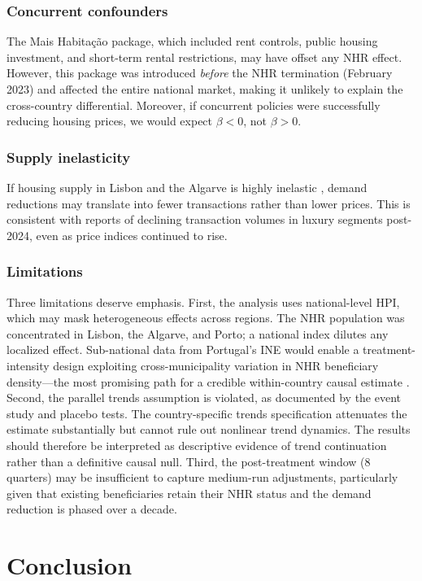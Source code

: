 \documentclass[12pt]{article}
\begin{document}
\subsubsection*{Concurrent confounders} The Mais Habita\c{c}\~{a}o package, which included rent controls, public housing investment, and short-term rental restrictions, may have offset any NHR effect. However, this package was introduced \emph{before} the NHR termination (February 2023) and affected the entire national market, making it unlikely to explain the cross-country differential. Moreover, if concurrent policies were successfully reducing housing prices, we would expect $\beta < 0$, not $\beta > 0$.

\subsubsection*{Supply inelasticity} If housing supply in Lisbon and the Algarve is highly inelastic \citep{saiz2010geographic}, demand reductions may translate into fewer transactions rather than lower prices. This is consistent with reports of declining transaction volumes in luxury segments post-2024, even as price indices continued to rise.

\subsubsection*{Limitations} Three limitations deserve emphasis. First, the analysis uses national-level HPI, which may mask heterogeneous effects across regions. The NHR population was concentrated in Lisbon, the Algarve, and Porto; a national index dilutes any localized effect. Sub-national data from Portugal's INE would enable a treatment-intensity design exploiting cross-municipality variation in NHR beneficiary density---the most promising path for a credible within-country causal estimate \citep{dechaisemartin2020two}. Second, the parallel trends assumption is violated, as documented by the event study and placebo tests. The country-specific trends specification attenuates the estimate substantially but cannot rule out nonlinear trend dynamics. The results should therefore be interpreted as descriptive evidence of trend continuation rather than a definitive causal null. Third, the post-treatment window (8 quarters) may be insufficient to capture medium-run adjustments, particularly given that existing beneficiaries retain their NHR status and the demand reduction is phased over a decade.


\section{Conclusion}
\end{document}
